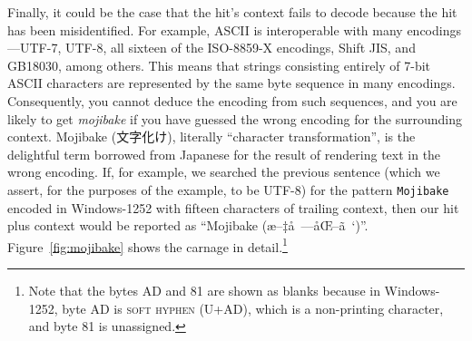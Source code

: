 \documentclass[5p,final,number,sort&compress]{elsarticle}
\newcommand{\re}[1]{\texttt{#1}}
\begin{document}
Finally, it could be the case that the hit's context fails to decode because the hit has been misidentified. For example, ASCII is interoperable with many encodings---UTF-7, UTF-8, all sixteen of the ISO-8859-X encodings, Shift JIS, and GB18030, among others. This means that strings consisting entirely of 7-bit ASCII characters are represented by the same byte sequence in many encodings. Consequently, you cannot deduce the encoding from such sequences, and you are likely to get \emph{mojibake} if you have guessed the wrong encoding for the surrounding context. Mojibake ({\cjk 文字化け}), literally ``character transformation'', is the delightful term borrowed from Japanese for the result of rendering text in the wrong encoding. If, for example, we searched the previous sentence (which we assert, for the purposes of the example, to be UTF-8) for the pattern \re{Mojibake} encoded in Windows-1252 with fifteen characters of trailing context, then our hit plus context would be reported as ``Mojibake (æ–‡å\ —åŒ–ã\ ‘)''. Figure~\ref{fig:mojibake} shows the carnage in detail.\footnote{Note that the bytes AD and 81 are shown as blanks because in Windows-1252, byte AD is \textsc{soft hyphen} (U+AD), which is a non-printing character, and byte 81 is unassigned.}
\end{document}
